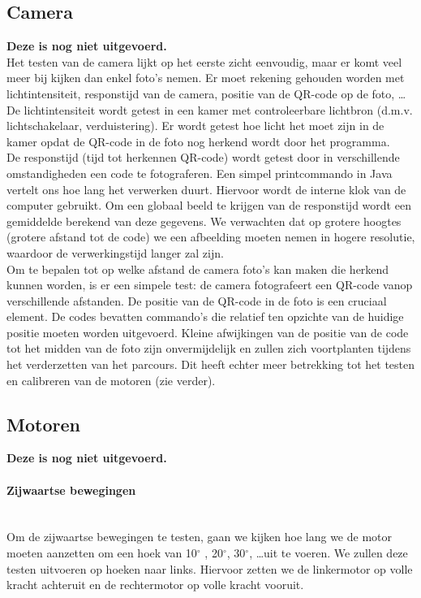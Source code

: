 \documentclass[tt]{penoverslag}
\begin{document}
\subsection{Camera}

\textbf{Deze is nog niet uitgevoerd.} \\

Het testen van de camera lijkt op het eerste zicht eenvoudig, maar er komt veel meer bij kijken dan enkel foto's nemen. Er moet rekening gehouden worden met lichtintensiteit, responstijd van de camera, positie van de QR-code op de foto, \ldots \\

De lichtintensiteit wordt getest in een kamer met controleerbare lichtbron (d.m.v. lichtschakelaar, verduistering). Er wordt getest hoe licht het moet zijn in de kamer opdat de QR-code in de foto nog herkend wordt door het programma. \\

De responstijd (tijd tot herkennen QR-code) wordt getest door in verschillende omstandigheden een code te fotograferen. Een simpel printcommando in Java vertelt ons hoe lang het verwerken duurt. Hiervoor wordt de interne klok van de computer gebruikt. Om een globaal beeld te krijgen van de responstijd wordt een gemiddelde berekend van deze gegevens. We verwachten dat op grotere hoogtes (grotere afstand tot de code) we een afbeelding moeten nemen in hogere resolutie, waardoor de verwerkingstijd langer zal zijn. \\

Om te bepalen tot op welke afstand de camera foto's kan maken die herkend kunnen worden, is er een simpele test: de camera fotografeert een QR-code vanop verschillende afstanden. 
De positie van de QR-code in de foto is een cruciaal element. De codes bevatten commando’s die relatief ten opzichte van de huidige positie moeten worden uitgevoerd. Kleine afwijkingen van de positie van de code tot het midden van de foto zijn onvermijdelijk en zullen zich voortplanten tijdens het verderzetten van het parcours. Dit heeft echter meer betrekking tot het testen en calibreren van de motoren (zie verder). \\

\subsection{Motoren}
\textbf{Deze is nog niet uitgevoerd.} \\

\paragraph{Zijwaartse bewegingen} ~\\ 
Om de zijwaartse bewegingen te testen, gaan we kijken hoe lang we de motor moeten aanzetten om een hoek van 10$^\circ$ , 20$^\circ$, 30$^\circ$, \ldots uit te voeren. We zullen deze testen uitvoeren op hoeken naar links. Hiervoor zetten we de linkermotor op volle kracht achteruit en de rechtermotor op volle kracht vooruit. \\
\end{document}
